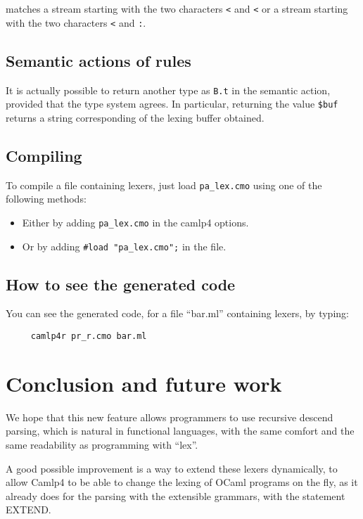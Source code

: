 \documentclass[11pt]{article}
\begin{document}
matches a stream starting with the two characters \verb/</ and
\verb/</ or a stream starting with the two characters \verb/</ and
\verb/:/.

\subsection{Semantic actions of rules}

It is actually possible to return another type as \verb/B.t/ in the
semantic action, provided that the type system agrees. In particular,
returning the value \verb/$buf/ returns a string corresponding of the
lexing buffer obtained.

\subsection{Compiling}

To compile a file containing lexers, just load \verb/pa_lex.cmo/ using
one of the following methods:

\begin{itemize}

\item Either by adding \verb/pa_lex.cmo/ in the camlp4 options.
\item Or by adding \verb/#load "pa_lex.cmo";/ in the file.

\end{itemize}

\subsection{How to see the generated code}

You can see the generated code, for a file ``bar.ml'' containing lexers, by
typing:

\begin{verbatim}
     camlp4r pr_r.cmo bar.ml
\end{verbatim}

\section{Conclusion and future work}

We hope that this new feature allows programmers to use recursive
descend parsing, which is natural in functional languages, with the
same comfort and the same readability as programming with ``lex''.

A good possible improvement is a way to extend these lexers
dynamically, to allow Camlp4 to be able to change the lexing of OCaml
programs on the fly, as it already does for the parsing with the
extensible grammars, with the statement EXTEND.
\end{document}
